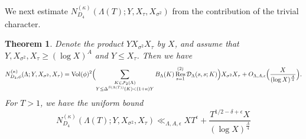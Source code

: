 \documentclass[10pt]{article}
\theoremstyle{plain}
\newtheorem{thm}{Theorem}[section]
\theoremstyle{definition}
\theoremstyle{remark}
\DeclareMathOperator{\Res}{Res}
\def\Vol{{\rm Vol}}
\def\FF{{\mathcal F}}
\def\cD{{\mathcal D}}
\begin{document}
We next estimate
$N_{D_4}^{(\kappa)}(\Lambda(T);Y,X_\tau,X_{\sigma^2})$ from the
contribution of the trivial character.
\begin{thm}\label{thMBcount}
Denote the product $YX_{\sigma^2}X_\tau$ by $X$, and assume that
$Y,X_{\sigma^2},X_\tau\geq (\log X)^A$ and $Y\leq X_\tau$. Then we
have
\begin{equation*}
\displaystyle N_{D_4,\phi}^{(\kappa)}(\Lambda;Y,X_{\sigma^2},X_\tau)=
\displaystyle  \Vol(\phi)^2\Bigl(
\sum_{\substack{K\in\FF_2(\Lambda)\\Y\leq\Delta^{S(\Lambda(T))}(K)<(1+\kappa)Y}}
B_{\Lambda}(K)\Res_{s=1}^{(2)}\cD_{\Lambda}(s,s;K)\Bigr)
X_{\sigma^2}X_\tau +
O_{\Lambda,A,\epsilon}\Bigl(\frac{X}{(\log X)^{\frac{A}{4}}}\Bigr).
\end{equation*}
For $T>1$, we have the uniform bound
\begin{equation*}
N_{D_4}^{(\kappa)}(\Lambda(T);Y,X_{\sigma^2},X_\tau)\ll_{\Lambda,A,\epsilon}
XT^\epsilon+\frac{T^{1/2-\delta+\epsilon}X}{(\log X)^{\frac{A}{4}}}
\end{equation*}
\end{thm}
\end{document}
